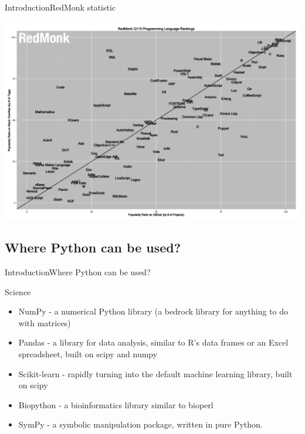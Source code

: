 \documentclass[10pt]{beamer}
\begin{document}
\begin{frame}{Introduction}{RedMonk statistic}
	\begin{center}
		\includegraphics[width=1\textwidth]{pictures/red_monk.png}
	\end{center}
\end{frame}

\subsection{Where Python can be used?}

\begin{frame}{Introduction}{Where Python can be used?}

\begin{block}{Science}
	\begin{itemize}	
		\item NumPy - a numerical Python library (a bedrock library for anything to do with matrices)
		
		\item Pandas - a library for data analysis, similar to R’s data frames or an Excel spreadsheet, built on scipy and numpy
		
		\item Scikit-learn - rapidly turning into the default machine learning library, built on scipy
		
		\item Biopython - a bioinformatics library similar to bioperl
		
		\item SymPy - a symbolic manipulation package, written in pure Python.
	\end{itemize}
	
\end{block}
\end{frame}
\end{document}
